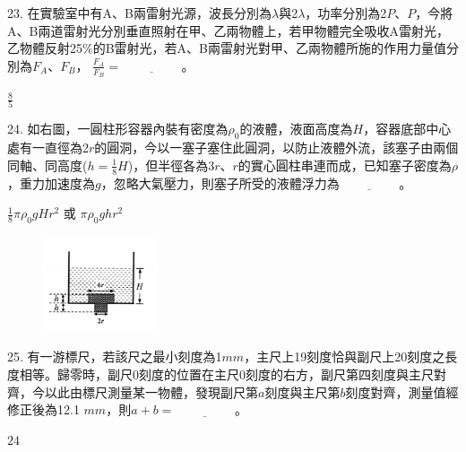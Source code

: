 \documentclass[cn,10pt,math=newtx,chinesefont=founder,device=ig]{elegantbook}
\begin{document}
\begin{example}
   23. 在實驗室中有A、B兩雷射光源，波長分別為$\lambda$與2$\lambda$，功率分別為2$P$、$P$，今將A、B兩道雷射光分別垂直照射在甲、乙兩物體上，若甲物體完全吸收A雷射光，乙物體反射25$\%$的B雷射光，若A、B兩雷射光對甲、乙兩物體所施的作用力量值分別為$F_A、F_B$， $\frac{F_A}{F_B}=\underline{\hspace{2cm}}$。\\
    \rightline{[桃園高中教甄109]}
\end{example}
\begin{solution}
    $\frac{8}{5}$
\end{solution}

\newpage

\begin{example}
   24. 如右圖，一圓柱形容器內裝有密度為$\rho_0$的液體，液面高度為$H$，容器底部中心處有一直徑為2$r$的圓洞，今以一塞子塞住此圓洞，以防止液體外流，該塞子由兩個同軸、同高度($h=\frac{1}{8}H$)，但半徑各為3$r$、$r$的實心圓柱串連而成，已知塞子密度為$\rho$，重力加速度為$g$，忽略大氣壓力，則塞子所受的液體浮力為$\underline{\hspace{2cm}}$。\\
    \rightline{[桃園高中教甄109]}
\end{example}
\begin{solution}
    $\frac{1}{8} \pi \rho_0 gHr^2$ 或 $\pi \rho_0 ghr^2$
\end{solution}
\begin{figure}[htbp]
    \flushright
    \includegraphics[width=0.3\textwidth]{image/109桃園24.png}
  \end{figure}
\newpage

\begin{example}
   25. 有一游標尺，若該尺之最小刻度為1$mm$，主尺上19刻度恰與副尺上20刻度之長度相等。歸零時，副尺0刻度的位置在主尺0刻度的右方，副尺第四刻度與主尺對齊，今以此由標尺測量某一物體，發現副尺第$a$刻度與主尺第$b$刻度對齊，測量值經修正後為12.1 $mm$，則$a+b=\underline{\hspace{2cm}}$。\\
    \rightline{[桃園高中教甄109]}
\end{example}
\begin{solution}
    $24$
\end{solution}
\end{document}
